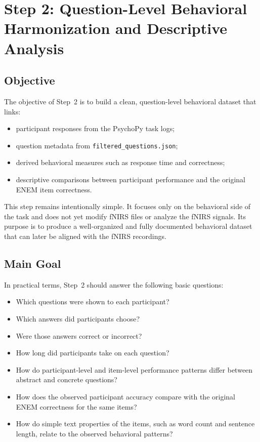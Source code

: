 \section{Step 2: Question-Level Behavioral Harmonization and Descriptive Analysis}
\label{sec:step2_behavior}

\subsection{Objective}
The objective of Step~2 is to build a clean, question-level behavioral dataset that links:
\begin{itemize}
    \item participant responses from the PsychoPy task logs;
    \item question metadata from \texttt{filtered\_questions.json};
    \item derived behavioral measures such as response time and correctness;
    \item descriptive comparisons between participant performance and the original ENEM item correctness.
\end{itemize}

This step remains intentionally simple.
It focuses only on the behavioral side of the task and does not yet modify fNIRS files or analyze the fNIRS signals.
Its purpose is to produce a well-organized and fully documented behavioral dataset that can later be aligned with the fNIRS recordings.

\subsection{Main Goal}
In practical terms, Step~2 should answer the following basic questions:
\begin{itemize}
    \item Which questions were shown to each participant?
    \item Which answers did participants choose?
    \item Were those answers correct or incorrect?
    \item How long did participants take on each question?
    \item How do participant-level and item-level performance patterns differ between abstract and concrete questions?
    \item How does the observed participant accuracy compare with the original ENEM correctness for the same items?
    \item How do simple text properties of the items, such as word count and sentence length, relate to the observed behavioral patterns?
\end{itemize}

